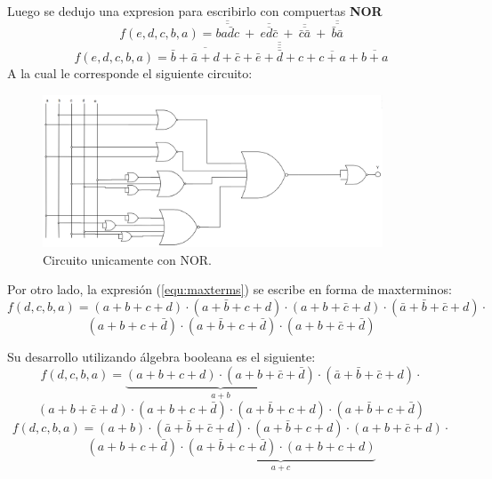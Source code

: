 \documentclass[a4paper]{article}
\begin{document}
\begin{center}
Luego se dedujo una expresion para escribirlo con compuertas \textbf{NOR}
\[
	f \left( e,d,c,b,a \right) = \overline{\overline{b a \bar{d} c }} \ + \  \overline{\overline{ e d \bar{c}}} \ + \ \overline{\overline{\bar{c} \bar{a}}} \ + \ \overline{\overline{ \bar{b} \bar{a}}}
\]
\[
	f \left( e,d,c,b,a \right) =\overline{\overline{\overline{\bar{b}+\bar{a}+d+\bar{c}}+\overline{\bar{e}+\bar{d}+c}+\overline{c+a}+\overline{b+a}}}
\]
A la cual le corresponde el siguiente circuito:
\begin{figure}[H]
	\centering
	\includegraphics[width=0.9\textwidth]{Circuito4.PNG}
	\caption{Circuito unicamente con NOR.}
	\label{fig:circ4}
\end{figure}

Por otro lado, la expresión (\ref{equ:maxterms}) se escribe en forma de maxterminos:
\[
	f \left( d,c,b,a \right) = \left( a + b + c + d \right) \cdot \left( a + \bar{b} + c + d\right) \cdot \left( a + b+ \bar{c} + d \right) \cdot \left( \bar{a} + \bar{b} + \bar{c} + d \right) \cdot
\]
\[
	\left( a + b + c + \bar{d} \right) \cdot \left( a + \bar{b} + c + \bar{d} \right) \cdot \left( a + b + \bar{c} +\bar{d} \right)
\]

Su desarrollo utilizando álgebra booleana es el siguiente:
\[
	f \left( d,c,b,a \right) = \underbrace{\left( a + b + c + d \right) \cdot \left( a + b + \bar{c} +\bar{d} \right)}_{a + b} \cdot 
	\left( \bar{a} + \bar{b} + \bar{c} + d \right) \cdot 
\]
\[
	\left( a + b + \bar{c} + d \right) \cdot
	\left( a + b + c + \bar{d} \right) \cdot 
	\left( a + \bar{b} + c + d\right) \cdot 
	\left( a + \bar{b} + c + \bar{d} \right)
\]
\[
	f \left( d,c,b,a \right) = \left( a + b \right) \cdot \left( \bar{a} + \bar{b} + \bar{c} + d \right) \cdot 
	\left( a + \bar{b} + c + d\right) \cdot \left( a + b + \bar{c} + d \right) \cdot
\]
\[
	\left( a + b + c + \bar{d} \right) \cdot \underbrace{\left( a + \bar{b} + c + \bar{d} \right)  \cdot \left( a + b + c + d \right)}_{a + c}
\]


\end{center}
\end{document}
